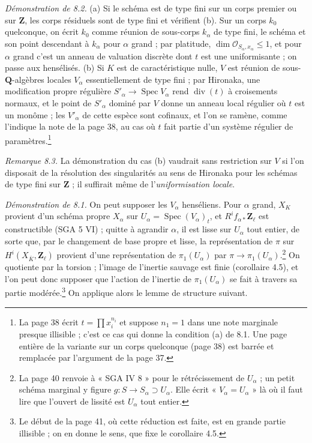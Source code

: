 \documentclass[11pt,a4paper]{article}
\begin{document}
\emph{Démonstration de 8.2.} (a) Si le schéma est de type fini sur un corps
premier ou sur $\mathbf{Z}$, les corps résiduels sont de type fini et vérifient
(b). Sur un corps $k_0$ quelconque, on écrit $k_0$ comme réunion de sous-corps
$k_\alpha$ de type fini, le schéma et son point descendant à $k_\alpha$ pour
$\alpha$ grand ; par platitude, $\dim \mathcal{O}_{S_\alpha, x_\alpha} \leq 1$,
et pour $\alpha$ grand c'est un anneau de valuation discrète dont $t$ est une
uniformisante ; on passe aux hensélisés. (b) Si $K$ est de caractéristique
nulle, $V$ est réunion de sous-$\mathbf{Q}$-algèbres locales $V_\alpha$
essentiellement de type fini ; par Hironaka, une modification propre régulière
$S'_\alpha \to \operatorname{Spec} V_\alpha$ rend $\operatorname{div}(t)$ à
croisements normaux, et le point de $S'_\alpha$ dominé par $V$ donne un anneau
local régulier où $t$ est un monôme ; les $V'_\alpha$ de cette espèce sont
cofinaux, et l'on se ramène, comme l'indique la note de la page 38, au cas où
$t$ fait partie d'un système régulier de paramètres.\footnote{La page 38 écrit
$t = \prod x_i^{n_i}$ et suppose $n_1 = 1$ dans une note marginale presque
illisible ; c'est ce cas qui donne la condition (a) de 8.1. Une page entière de
la variante sur un corps quelconque (page 38) est barrée et remplacée par
l'argument de la page 37.}

\emph{Remarque 8.3.} La démonstration du cas (b) vaudrait sans restriction sur
$V$ si l'on disposait de la résolution des singularités au sens de Hironaka pour
les schémas de type fini sur $\mathbf{Z}$ ; il suffirait même de
l'\emph{uniformisation locale}.

\emph{Démonstration de 8.1.} On peut supposer les $V_\alpha$ henséliens. Pour
$\alpha$ grand, $X_K$ provient d'un schéma propre $X_\alpha$ sur
$U_\alpha = \operatorname{Spec}(V_\alpha)_t$, et $R^i f_{\alpha *}\mathbf{Z}_\ell$
est constructible (SGA 5 VI) ; quitte à agrandir $\alpha$, il est lisse sur
$U_\alpha$ tout entier, de sorte que, par le changement de base propre et
lisse, la représentation de $\pi$ sur $H^i(X_{\overline K}, \mathbf{Z}_\ell)$
provient d'une représentation de $\pi_1(U_\alpha)$ par
$\pi \to \pi_1(U_\alpha)$.\footnote{La page 40 renvoie à « SGA IV 8 » pour le
rétrécissement de $U_\alpha$ ; un petit schéma marginal y figure
$g : S \to S_\alpha \supset U_\alpha$. Elle écrit « $V_\alpha = U_\alpha$ » là
où il faut lire que l'ouvert de lissité est $U_\alpha$ tout entier.} On quotiente
par la torsion ; l'image de l'inertie sauvage est finie (corollaire 4.5), et
l'on peut donc supposer que l'action de l'inertie de $\pi_1(U_\alpha)$ se fait
à travers sa partie modérée.\footnote{Le début de la page 41, où cette
réduction est faite, est en grande partie illisible ; on en donne le sens, que
fixe le corollaire 4.5.} On applique alors le lemme de structure suivant.
\end{document}
